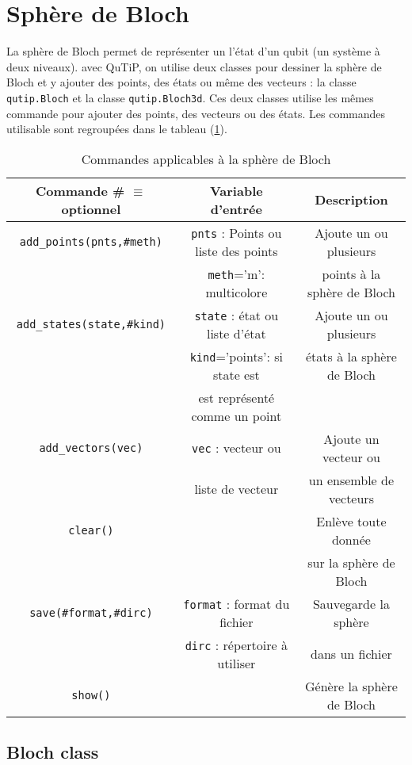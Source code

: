 \section{Sphère de Bloch}
La sphère de Bloch permet de représenter un l'état d'un qubit (un système à deux 
niveaux). avec QuTiP, on utilise deux classes pour dessiner la sphère de Bloch 
et y ajouter des points, des états ou même des vecteurs : la classe 
\texttt{qutip.Bloch} et la classe \texttt{qutip.Bloch3d}. Ces deux classes 
utilise les mêmes commande pour ajouter des points, des vecteurs ou des états. 
Les commandes utilisable sont regroupées dans le tableau (\ref{Bloch}).
\begin{table}[!h]
\begin{center}
\begin{tabular}{|c|c|c|}\hline \hline
\textbf{Commande \# $\equiv$ optionnel} & \textbf{Variable d'entrée} & 
\textbf{Description} \\ \hline \hline
\texttt{add\_points(pnts,\#meth)} & \texttt{pnts} : Points ou liste des points 
& 
Ajoute un ou plusieurs\\
 & \texttt{meth}='m': multicolore & points à la sphère de Bloch \\ \hline
\texttt{add\_states(state,\#kind)} & \texttt{state} : état ou liste d'état & 
Ajoute un ou plusieurs \\
 & \texttt{kind}='points': si state est & états à la sphère de Bloch \\
 & est représenté comme un point & \\ \hline
\texttt{add\_vectors(vec)} & \texttt{vec} : vecteur ou & Ajoute un vecteur ou \\
 & liste de vecteur & un ensemble de vecteurs \\ \hline
\texttt{clear()} & & Enlève toute donnée \\
 & & sur la sphère de Bloch \\ \hline
\texttt{save(\#format,\#dirc)} & \texttt{format} : format du fichier & 
Sauvegarde la sphère \\
 & \texttt{dirc} : répertoire à utiliser & dans un fichier \\ \hline
\texttt{show()} & & Génère la sphère de Bloch\\ \hline
\end{tabular}
\end{center}
\caption{Commandes applicables à la sphère de Bloch}
\label{Bloch}
\end{table}

\subsection{Bloch class}

